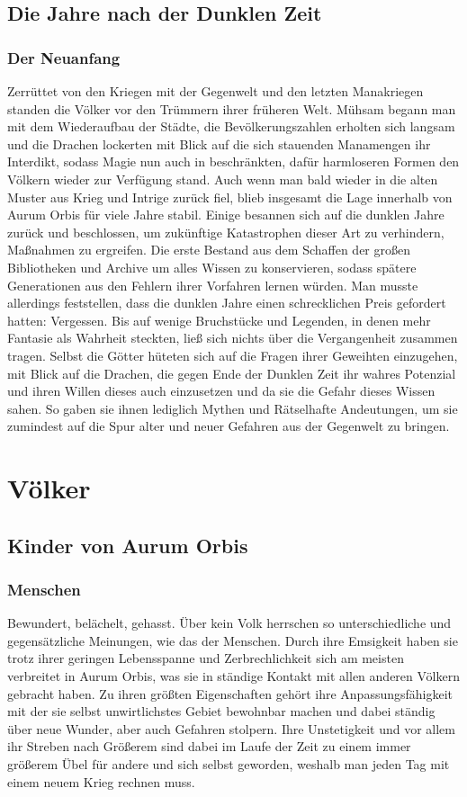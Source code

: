 \documentclass[a4paper,12pt,oneside]{book}
\begin{document}
\chapter{Die Jahre nach der Dunklen Zeit}
\section{Der Neuanfang}
Zerrüttet von den Kriegen mit der Gegenwelt und den letzten Manakriegen standen die Völker vor den Trümmern ihrer früheren Welt. Mühsam begann man mit dem Wiederaufbau der Städte, die Bevölkerungszahlen erholten sich langsam und die Drachen lockerten mit Blick auf die sich stauenden Manamengen ihr Interdikt, sodass Magie nun auch in beschränkten, dafür harmloseren Formen den Völkern wieder zur Verfügung stand. Auch wenn man bald wieder in die alten Muster aus Krieg und Intrige zurück fiel, blieb insgesamt die Lage innerhalb von Aurum Orbis für viele Jahre stabil. Einige besannen sich auf die dunklen Jahre zurück und beschlossen, um zukünftige Katastrophen dieser Art zu verhindern, Maßnahmen zu ergreifen. Die erste Bestand aus dem Schaffen der großen Bibliotheken und Archive um alles Wissen zu konservieren, sodass spätere Generationen aus den Fehlern ihrer Vorfahren lernen würden. Man musste allerdings feststellen, dass die dunklen Jahre einen schrecklichen Preis gefordert hatten: Vergessen. Bis auf wenige Bruchstücke und Legenden, in denen mehr Fantasie als Wahrheit steckten, ließ sich nichts über die Vergangenheit zusammen tragen. Selbst die Götter hüteten sich auf die Fragen ihrer Geweihten einzugehen, mit Blick auf die Drachen, die gegen Ende der Dunklen Zeit ihr wahres Potenzial und ihren Willen dieses auch einzusetzen und da sie die Gefahr dieses Wissen sahen. So gaben sie ihnen lediglich Mythen und Rätselhafte Andeutungen, um sie zumindest auf die Spur alter und neuer Gefahren aus der Gegenwelt zu bringen.

\part{Völker}
\setcounter{chapter}{0}
\chapter{Kinder von Aurum Orbis}

\section{Menschen}\label{Menschen}
Bewundert, belächelt, gehasst. Über kein Volk herrschen so unterschiedliche und gegensätzliche Meinungen, wie das der Menschen. Durch ihre Emsigkeit haben sie trotz ihrer geringen Lebensspanne und Zerbrechlichkeit sich am meisten verbreitet in Aurum Orbis, was sie in ständige Kontakt mit allen anderen Völkern gebracht haben. Zu ihren größten Eigenschaften gehört ihre Anpassungsfähigkeit mit der sie selbst unwirtlichstes Gebiet bewohnbar machen und dabei ständig über neue Wunder, aber auch Gefahren stolpern. Ihre Unstetigkeit und vor allem ihr Streben nach Größerem sind dabei im Laufe der Zeit zu einem immer größerem Übel für andere und sich selbst geworden, weshalb man jeden Tag mit einem neuem Krieg rechnen muss.
\end{document}
